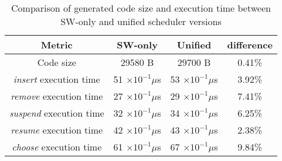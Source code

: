\begin{table}[h]
    \begin{center}
        \begin{tabular}{cccc}
            \toprule
            \textbf{Metric} & \textbf{SW-only} & \textbf{Unified} & \textbf{difference}
            \tabularnewline
            \midrule
            Code size                     & 29580 B                 & 29700 B                 & 0.41\%
            \tabularnewline
            \emph{insert} execution time  & 51 $\times 10^{-1}\mu$s & 53 $\times 10^{-1}\mu$s & 3.92\%
            \tabularnewline                                           
            \emph{remove} execution time  & 27 $\times 10^{-1}\mu$s & 29 $\times 10^{-1}\mu$s & 7.41\%
            \tabularnewline                                           
            \emph{suspend} execution time & 32 $\times 10^{-1}\mu$s & 34 $\times 10^{-1}\mu$s & 6.25\%
            \tabularnewline                                           
            \emph{resume} execution time  & 42 $\times 10^{-1}\mu$s & 43 $\times 10^{-1}\mu$s & 2.38\%
            \tabularnewline                                           
            \emph{choose} execution time  & 61 $\times 10^{-1}\mu$s & 67 $\times 10^{-1}\mu$s & 9.84\%
            \tabularnewline
            \bottomrule
        \end{tabular}
    \end{center}
    \caption{Comparison of generated code size and execution time between SW-only and unified
        scheduler versions}
    \label{tab:results-sw}
\end{table}
